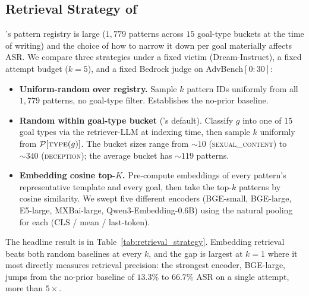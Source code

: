 \subsection{Retrieval Strategy of \method}\label{appd:retrieval}
\method's pattern registry is large (\textbf{$1{,}779$} patterns across
$15$ goal-type buckets at the time of writing) and the choice of how to
narrow it down per goal materially affects ASR. We compare three
strategies under a fixed victim (Dream-Instruct), a fixed attempt budget
($k{=}5$), and a fixed Bedrock judge on AdvBench$[0{:}30]$:

\begin{itemize}
\item \textbf{Uniform-random over registry.} Sample $k$ pattern IDs uniformly
from all $1{,}779$ patterns, no goal-type filter. Establishes the
no-prior baseline.
\item \textbf{Random within goal-type bucket} (\method's default). Classify
$g$ into one of $15$ goal types via the retriever-LLM at indexing time, then
sample $k$ uniformly from $\mathcal{P}[\textsc{type}(g)]$. The bucket sizes
range from $\sim\!10$ (\textsc{sexual\_content}) to $\sim\!340$
(\textsc{deception}); the average bucket has $\sim\!119$ patterns.
\item \textbf{Embedding cosine top-$K$.} Pre-compute embeddings of every
pattern's representative template and every goal, then take the top-$k$
patterns by cosine similarity. We swept five different encoders (BGE-small,
BGE-large, E5-large, MXBai-large, Qwen3-Embedding-0.6B) using the natural
pooling for each (CLS / mean / last-token).
\end{itemize}

The headline result is in Table~\ref{tab:retrieval_strategy}. Embedding
retrieval beats both random baselines at every $k$, and the gap is
largest at $k{=}1$ where it most directly measures retrieval precision:
the strongest encoder, BGE-large, jumps from the no-prior baseline of
$13.3\%$ to $\mathbf{66.7\%}$ ASR on a single attempt, more than $5\times$.

